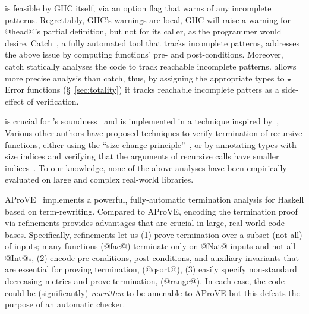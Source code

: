 is feasible by GHC itself, via an option flag that warns of any incomplete patterns.
%
Regrettably, GHC's warnings are local, \ie
GHC will raise a warning for @head@'s partial definition, 
but not for its caller, as the programmer would desire.
%
Catch~\cite{catch}, 
a fully automated tool that tracks incomplete patterns,
addresses the above issue
%
by computing functions' pre- and post-conditions.
Moreover, catch statically analyses the code 
to track reachable incomplete patterns.
%
\toolname allows more precise analysis than catch, 
thus, by assigning the appropriate
types to $\star$Error functions (\S~\ref{sec:totality}) 
it tracks reachable incomplete patters 
as a side-effect of verification.

is crucial for \toolname's soundness~\cite{LiquidICFP14} 
and is implemented in a technique inspired by~\cite{XiTerminationLICS01}, 
%
Various other authors have proposed techniques to verify termination of
recursive functions, either using the ``size-change
principle''~\cite{JonesB04,Sereni05}, or by annotating types with size indices
and verifying that the arguments of recursive calls have smaller
indices~\cite{HughesParetoSabry96,BartheTermination}.
%
To our knowledge, none of the above analyses have been empirically
evaluated on large and complex real-world libraries.

AProVE~\cite{Giesl11} implements a powerful, fully-automatic
termination analysis for Haskell based on term-rewriting.
%
Compared to AProVE,
encoding the termination proof via 
refinements provides advantages that are crucial in 
large, real-world code bases. 
Specifically, refinements
let us
%
(1) prove termination over a subset 
    (not all) of inputs; many functions (\eg @fac@) 
    terminate only on @Nat@ inputs and not all @Int@s,
%
(2) encode pre-conditions, 
    post-conditions, and auxiliary invariants that 
    are essential for proving termination, (\eg @qsort@),
%
(3) easily specify non-standard 
    decreasing metrics and prove termination, (\eg @range@).
%
In each case, the code could be (significantly) 
\emph{rewritten} to be amenable to AProVE but this defeats
the purpose of an automatic checker.
%



